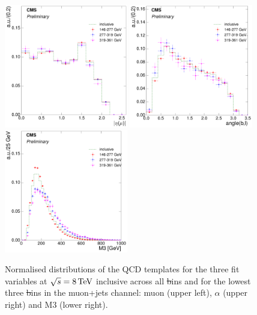 \begin{figure}[hbtp]
    \centering
     \includegraphics[width=0.48\textwidth]{Chapters/04_Analysis/04b_XSections/images/8TeV/fit_variables/muon/ST/muon_absolute_eta/qcd/ST_muon_absolute_eta_0orMoreBtag_QCD_template_comparison.pdf}\hfill
     \includegraphics[width=0.48\textwidth]{Chapters/04_Analysis/04b_XSections/images/8TeV/fit_variables/muon/ST/angle_bl/qcd/ST_angle_bl_1orMoreBtag_QCD_template_comparison.pdf}\\
     \includegraphics[width=0.48\textwidth]{Chapters/04_Analysis/04b_XSections/images/8TeV/fit_variables/muon/ST/M3/qcd/ST_M3_0orMoreBtag_QCD_template_comparison.pdf}\\
	 \caption{Normalised distributions of the QCD templates for the three fit variables at $\sqrt{s}=8\,\text{Te\hspace{-.08em}V}$
	 inclusive across all \st bins and for the lowest three \st bins in the muon+jets channel: muon \abseta
	 (upper left), $\alpha$ (upper right) and M3 (lower right).}
     \label{fig:ST_fit_variable_qcd_comparisons_muon_8TeV}
\end{figure}


